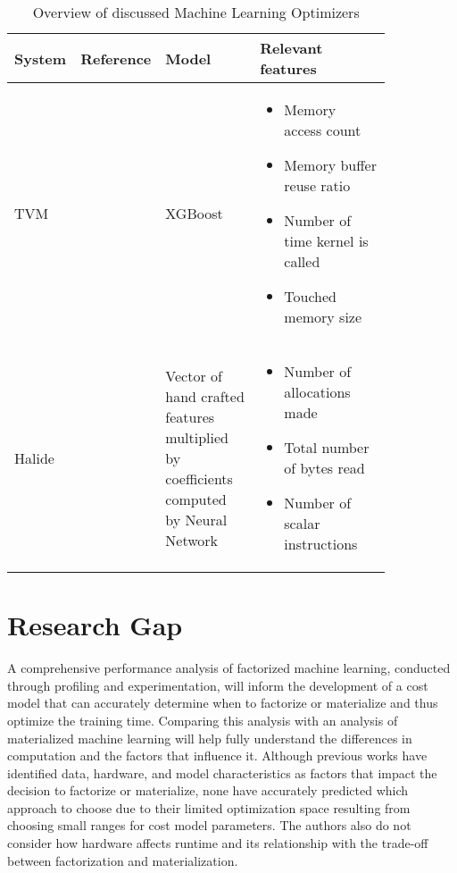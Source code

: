 \begin{table}[ht]
	\centering
	\begin{tabular}{p{0.15\linewidth}p{0.09\linewidth}p{0.25\linewidth}p{0.35\linewidth}}
		\toprule
		System & Reference                & Model                                                                                 & Relevant features                                                                                                                                                                              \\ \midrule \midrule

		TVM    & \cite{tvm}               & XGBoost                                                                               & \begin{itemize}[noitemsep,topsep=0pt,leftmargin=0.3cm] \item Memory access count \item Memory buffer reuse ratio \item Number of time kernel is called \item Touched memory size \end{itemize} \\ \midrule
		Halide & \cite{halide_cost_model} & Vector of hand crafted features multiplied by coefficients computed by Neural Network & \begin{itemize}[noitemsep,topsep=0pt,leftmargin=0.3cm] \item Number of allocations made \item Total number of bytes read \item Number of scalar instructions \end{itemize}                     \\ \bottomrule
	\end{tabular}
	\caption{Overview of discussed Machine Learning Optimizers}
	\label{tab:optimizer_overview}
\end{table}

\section{Research Gap}
A comprehensive performance analysis of factorized machine learning, conducted through profiling and experimentation, will inform the development of a cost model that can accurately determine when to factorize or materialize and thus optimize the training time. Comparing this analysis with an analysis of materialized machine learning will help fully understand the differences in computation and the factors that influence it. Although previous works have identified data, hardware, and model characteristics as factors that impact the decision to factorize or materialize, none have accurately predicted which approach to choose due to their limited optimization space resulting from choosing small ranges for cost model parameters. The authors also do not consider how hardware affects runtime and its relationship with the trade-off between factorization and materialization.